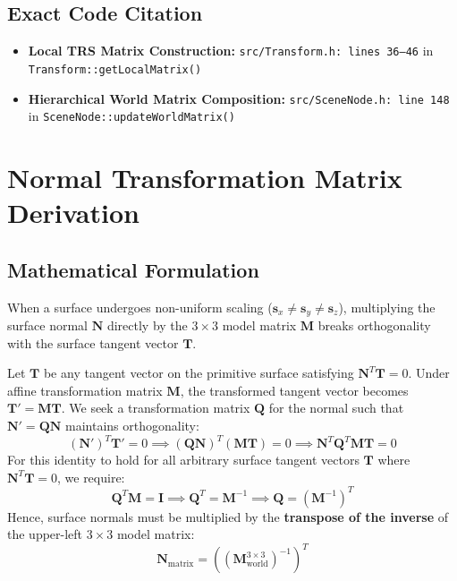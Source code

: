 \subsection{Exact Code Citation}
\begin{itemize}
    \item \textbf{Local TRS Matrix Construction:} \texttt{src/Transform.h: lines 36--46} in \texttt{Transform::getLocalMatrix()}
    \item \textbf{Hierarchical World Matrix Composition:} \texttt{src/SceneNode.h: line 148} in \texttt{SceneNode::updateWorldMatrix()}
\end{itemize}

\section{Normal Transformation Matrix Derivation}
\subsection{Mathematical Formulation}
When a surface undergoes non-uniform scaling ($\mathbf{s}_x \neq \mathbf{s}_y \neq \mathbf{s}_z$), multiplying the surface normal $\mathbf{N}$ directly by the $3\times 3$ model matrix $\mathbf{M}$ breaks orthogonality with the surface tangent vector $\mathbf{T}$.

Let $\mathbf{T}$ be any tangent vector on the primitive surface satisfying $\mathbf{N}^T \mathbf{T} = 0$. Under affine transformation matrix $\mathbf{M}$, the transformed tangent vector becomes $\mathbf{T}' = \mathbf{M} \mathbf{T}$. We seek a transformation matrix $\mathbf{Q}$ for the normal such that $\mathbf{N}' = \mathbf{Q} \mathbf{N}$ maintains orthogonality:
\begin{equation}
(\mathbf{N}')^T \mathbf{T}' = 0 \implies (\mathbf{Q} \mathbf{N})^T (\mathbf{M} \mathbf{T}) = 0 \implies \mathbf{N}^T \mathbf{Q}^T \mathbf{M} \mathbf{T} = 0
\end{equation}
For this identity to hold for all arbitrary surface tangent vectors $\mathbf{T}$ where $\mathbf{N}^T \mathbf{T} = 0$, we require:
\begin{equation}
\mathbf{Q}^T \mathbf{M} = \mathbf{I} \implies \mathbf{Q}^T = \mathbf{M}^{-1} \implies \mathbf{Q} = (\mathbf{M}^{-1})^T
\label{eq:normal_matrix}
\end{equation}
Hence, surface normals must be multiplied by the \textbf{transpose of the inverse} of the upper-left $3\times 3$ model matrix:
\begin{equation}
\mathbf{N}_{\text{matrix}} = \left( (\mathbf{M}_{\text{world}}^{3\times 3})^{-1} \right)^T
\end{equation}

